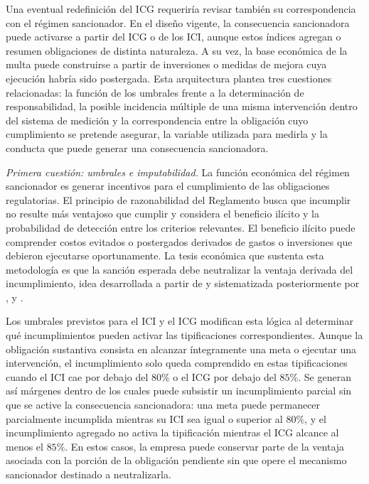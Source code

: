 Una eventual redefinición del ICG requeriría revisar también su correspondencia con el régimen sancionador. En el diseño vigente, la consecuencia sancionadora puede activarse a partir del ICG o de los ICI, aunque estos índices agregan o resumen obligaciones de distinta naturaleza. A su vez, la base económica de la multa puede construirse a partir de inversiones o medidas de mejora cuya ejecución habría sido postergada. Esta arquitectura plantea tres cuestiones relacionadas: la función de los umbrales frente a la determinación de responsabilidad, la posible incidencia múltiple de una misma intervención dentro del sistema de medición y la correspondencia entre la obligación cuyo cumplimiento se pretende asegurar, la variable utilizada para medirla y la conducta que puede generar una consecuencia sancionadora.

\textit{Primera cuestión: umbrales e imputabilidad.} La función económica del régimen sancionador es generar incentivos para el cumplimiento de las obligaciones regulatorias. El principio de razonabilidad del Reglamento busca que incumplir no resulte más ventajoso que cumplir y considera el beneficio ilícito y la probabilidad de detección entre los criterios relevantes. El beneficio ilícito puede comprender costos evitados o postergados derivados de gastos o inversiones que debieron ejecutarse oportunamente. La tesis económica que sustenta esta metodología es que la sanción esperada debe neutralizar la ventaja derivada del incumplimiento, idea desarrollada a partir de \citet{becker1968crime} y sistematizada posteriormente por \citet{stigler1970optimum}, \citet{polinsky2000economic} y \citet{polinsky2007theory}.

Los umbrales previstos para el ICI y el ICG modifican esta lógica al determinar qué incumplimientos pueden activar las tipificaciones correspondientes. Aunque la obligación sustantiva consista en alcanzar íntegramente una meta o ejecutar una intervención, el incumplimiento solo queda comprendido en estas tipificaciones cuando el ICI cae por debajo del \(80\%\) o el ICG por debajo del \(85\%\). Se generan así márgenes dentro de los cuales puede subsistir un incumplimiento parcial sin que se active la consecuencia sancionadora: una meta puede permanecer parcialmente incumplida mientras su ICI sea igual o superior al \(80\%\), y el incumplimiento agregado no activa la tipificación mientras el ICG alcance al menos el \(85\%\). En estos casos, la empresa puede conservar parte de la ventaja asociada con la porción de la obligación pendiente sin que opere el mecanismo sancionador destinado a neutralizarla.

